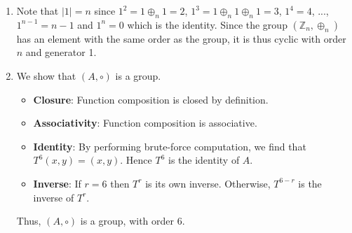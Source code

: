 \begin{enumerate}
    \item Note that $|1| = n$ since $1^2 = 1 \oplus_n 1 = 2$, $1^3 = 1 \oplus_n 1 \oplus_n 1 = 3$, $1^4 = 4$, ..., $1^{n-1} = n-1$ and $1^n = 0$ which is the identity. Since the group $(\mathbb{Z}_n, \oplus_n)$ has an element with the same order as the group, it is thus cyclic with order $n$ and generator 1.

    \item We show that $(A, \circ)$ is a group.
    \begin{itemize}
            \item \textbf{Closure}: Function composition is closed by definition.
            \item \textbf{Associativity}: Function composition is associative.
            \item \textbf{Identity}: By performing brute-force computation, we find that $T^6(x, y) = (x, y)$. Hence $T^6$ is the identity of $A$.
            \item \textbf{Inverse}: If $r = 6$ then $T^r$ is its own inverse. Otherwise, $T^{6-r}$ is the inverse of $T^r$.
    \end{itemize}
    Thus, $(A, \circ)$ is a group, with order 6.
\end{enumerate}

